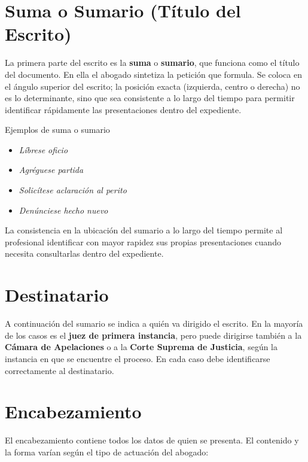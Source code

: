 \documentclass[12pt,oneside]{book}
\begin{document}
\section{Suma o Sumario (Título del Escrito)}

La primera parte del escrito es la \textbf{suma} o \textbf{sumario}, que funciona como el título del documento. En ella el abogado sintetiza la petición que formula. Se coloca en el ángulo superior del escrito; la posición exacta (izquierda, centro o derecha) no es lo determinante, sino que sea consistente a lo largo del tiempo para permitir identificar rápidamente las presentaciones dentro del expediente.

\begin{example}{Ejemplos de suma o sumario}
\begin{itemize}
    \item \textit{Líbrese oficio}
    \item \textit{Agréguese partida}
    \item \textit{Solicítese aclaración al perito}
    \item \textit{Denúnciese hecho nuevo}
\end{itemize}
\end{example}

\begin{note}
La consistencia en la ubicación del sumario a lo largo del tiempo permite al profesional identificar con mayor rapidez sus propias presentaciones cuando necesita consultarlas dentro del expediente.
\end{note}

\section{Destinatario}

A continuación del sumario se indica a quién va dirigido el escrito. En la mayoría de los casos es el \textbf{juez de primera instancia}, pero puede dirigirse también a la \textbf{Cámara de Apelaciones} o a la \textbf{Corte Suprema de Justicia}, según la instancia en que se encuentre el proceso. En cada caso debe identificarse correctamente al destinatario.

\section{Encabezamiento}

El encabezamiento contiene todos los datos de quien se presenta. El contenido y la forma varían según el tipo de actuación del abogado:
\end{document}
